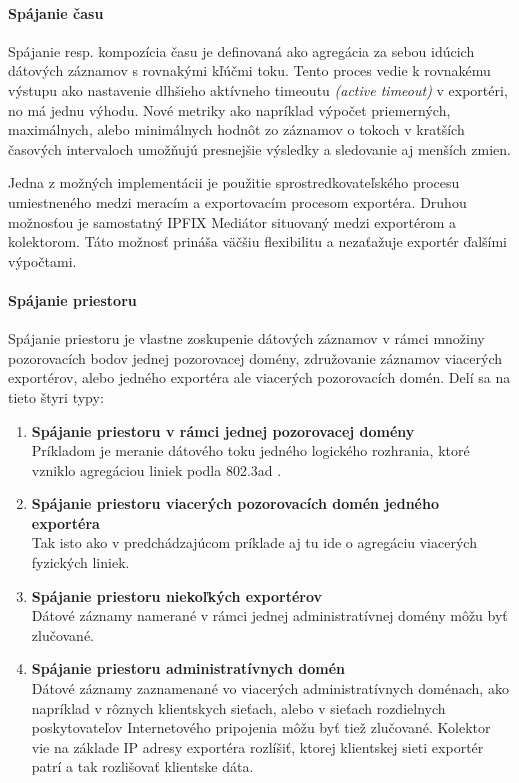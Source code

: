 \paragraph{Spájanie času}

Spájanie resp. kompozícia času je definovaná ako agregácia za sebou idúcich dátových záznamov s rovnakými
kľúčmi toku. Tento proces vedie k rovnakému výstupu ako nastavenie dlhšieho aktívneho timeoutu
\emph{(active timeout)} v exportéri, no má jednu výhodu. Nové metriky ako napríklad výpočet priemerných, 
maximálnych, alebo minimálnych hodnôt zo záznamov o tokoch v kratších časových intervaloch umožňujú 
presnejšie výsledky a sledovanie aj menších zmien.

Jedna z možných implementácii je použitie sprostredkovateľského procesu umiestneného medzi 
meracím a exportovacím procesom exportéra. Druhou možnosťou je samostatný IPFIX Mediátor situovaný medzi
exportérom a kolektorom. Táto možnosť prináša väčšiu flexibilitu a nezaťažuje exportér ďalšími výpočtami.

\paragraph{Spájanie priestoru} \label{sec:spatial}

Spájanie priestoru je vlastne zoskupenie dátových záznamov v rámci množiny pozorovacích bodov jednej 
pozorovacej domény, združovanie záznamov viacerých exportérov, alebo jedného exportéra ale viacerých 
pozorovacích domén. Delí sa na tieto štyri typy:

\begin{enumerate}
 \item \textbf{Spájanie priestoru v rámci jednej pozorovacej domény} \\ 
    Príkladom je meranie dátového toku jedného logického rozhrania, ktoré vzniklo agregáciou liniek 
    podla 802.3ad \citep{ieee802.3}.
 \item \textbf{Spájanie priestoru viacerých pozorovacích domén jedného exportéra} \\
    Tak isto ako v predchádzajúcom príklade aj tu ide o agregáciu viacerých fyzických liniek. 
 \item \textbf{Spájanie priestoru niekoľkých exportérov} \\
    Dátové záznamy namerané v rámci jednej administratívnej domény môžu byť zlučované.
 \item \textbf{Spájanie priestoru administratívnych domén} \\
    Dátové záznamy zaznamenané vo viacerých administratívnych doménach, ako napríklad v rôznych klientskych 
    sieťach, alebo v sieťach rozdielnych poskytovateľov Internetového pripojenia môžu byť tiež zlučované.
    Kolektor vie na základe IP adresy exportéra rozlíšiť, ktorej klientskej sieti exportér patrí a tak 
    rozlišovať klientske dáta.
\end{enumerate}

